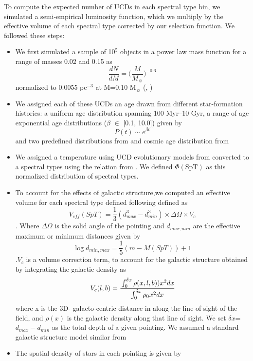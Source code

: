 \documentclass[manuscript]{aastex}
\begin{document}
To compute the expected number of UCDs in each spectral type bin, we simulated a semi-empirical luminosity function, which we multiply by the effective volume of each spectral type corrected by our selection function. We followed these steps:
\begin{itemize}
\item We first simulated a sample of 10$^5$ objects in a power law mass function for a range of masses 0.02 \Msun and 0.15 \Msun  as \begin{equation}  \frac{dN}{dM} =\biggl( \frac{M}{M_\sun}\biggl)^{-0.6}\end{equation} normalized to 0.0055 pc$^{-3}$ at M=0.10 M$_\sun$ (\citealt{1999ApJ...521..613R}, \citealt{2001ApJ...554.1274C})

\item We assigned each of these UCDs an age drawn from different star-formation histories:  a uniform age distribution spanning 100 Myr--10 Gyr, a range of age exponential age distributions ($\beta$ $\in$ [0.1, 10.0])  given by \begin{equation} P(t) \sim e^{\beta  t} \end{equation}  and two predefined distributions from \cite{2009MNRAS.397.1286A} and cosmic age distribution from \cite{2010ApJ...718.1171R}

\item We assigned a temperature using UCD evolutionary models from \cite{2003IAUS..211...41B} converted to a spectral types using the relation from \cite{Filippazzo2015}. We defined $\Phi(\text{SpT})$ as this normalized distribution of spectral types.

\item To account for the effects of galactic structure,we computed an effective volume for each spectral type defined  following \cite{2007ApJ...659..655B} defined as  \begin{equation} V_{eff}(SpT)=\frac{1}{3} (d_{max}^3-d_{min}^3) \times \Delta \Omega \times V_c \end{equation}. Where $\Delta \Omega$ is the solid angle of the pointing and  $d_{max, min}$ are the effective maximum or minimum distances given by \begin{equation} \log d_{min, max} =\frac{1}{5}(m-M(SpT))+1 \end{equation}.$V_c$ is a volume correction term, to account for the galactic structure obtained by integrating the galactic density as 
\begin{equation}
V_c (l, b)=\cfrac{\int _{0} ^{\delta x} \rho (x, l, b))  x^2 dx}{\int  _{0} ^{\delta x} \rho_0  x^2 dx}
\end{equation} where x is the 3D- galacto-centric distance in along the line of sight of the field, and  $\rho (x)$ is the galactic density along that line of sight. We set $\delta x$= $d_{max}-d_{min}$ as the total depth of a given pointing. We assumed a standard galactic structure model similar from \cite{2008ApJ...673..864J}
\item The spatial density of stars in each pointing is given by 


\end{itemize}
\end{document}
